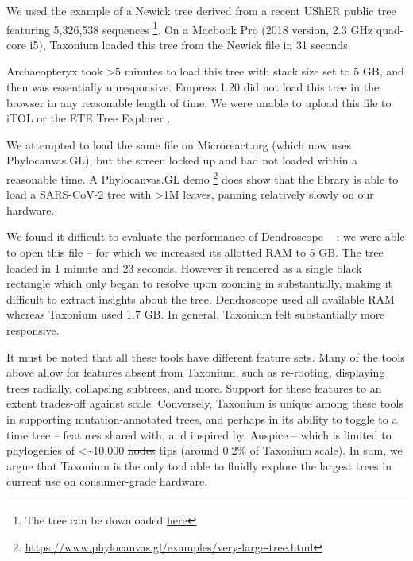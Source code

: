 \documentclass[twocolumn]{bioRxiv}
\providecommand{\DIFadd}[1]{{\protect\color{teal}#1}}
\providecommand{\DIFdel}[1]{{\protect\color{red}\sout{#1}}}
\providecommand{\DIFaddbegin}{}
\providecommand{\DIFaddend}{}
\providecommand{\DIFdelbegin}{}
\providecommand{\DIFdelend}{}
\begin{document}
We used the example of a Newick tree derived from a recent UShER public tree \citep{McBroome2021} featuring 5,326,538 sequences \footnote{The tree can be downloaded \href{https://hgwdev.gi.ucsc.edu/~angie/UShER\_SARS-CoV-2/2022/05/17/public-2022-05-17.all.nwk.gz}{here}}. On a Macbook Pro (2018 version, 2.3 GHz quad-core i5), Taxonium loaded this tree from the Newick file in 31 seconds. 

Archaeopteryx \citep{archaeopteryx} took >5 minutes to load this tree with stack size set to 5 GB, and then was essentially unresponsive. Empress 1.20 \citep{CantrellFedarko2021empress} did not load this tree in the browser in any reasonable length of time. We were unable to upload this file to iTOL \citep{itol} or the ETE Tree Explorer \citep{ete}.

We attempted to load the same file on Microreact.org \citep{argimon2016microreact} (which now uses Phylocanvas.GL), but the screen locked up and had not loaded within a reasonable time. A Phylocanvas.GL demo \footnote{\url{https://www.phylocanvas.gl/examples/very-large-tree.html}} does show that the library \citep{abudahab2021phylocanvas} is able to load a SARS-CoV-2 tree with >1M leaves, panning relatively slowly on our hardware.

We found it difficult to evaluate the performance of Dendroscope \DIFaddbegin \DIFadd{\mbox{%
\citep{pmid18034891}}\hspace{0pt}%
}\DIFaddend : we were able to open this file -- for which we increased its allotted RAM to 5 GB. The tree loaded in 1 minute and 23 seconds. However it rendered as a single black rectangle which only began to resolve upon zooming in substantially, making it difficult to extract insights about the tree. Dendroscope used all available RAM whereas Taxonium used 1.7 GB. In general, Taxonium felt substantially more responsive.


It must be noted that all these tools have different feature sets. Many of the tools above allow for features absent from Taxonium, such as re-rooting, displaying trees radially, collapsing subtrees, and more. Support for these features to an extent trades-off against scale. Conversely, Taxonium is unique among these tools in supporting mutation-annotated trees, and perhaps in its ability to toggle to a time tree -- features shared with, and inspired by, Auspice \citep{nextstrain} -- which is limited to phylogenies of <\textasciitilde10,000 \DIFdelbegin \DIFdel{nodes }\DIFdelend \DIFaddbegin \DIFadd{tips }\DIFaddend (around 0.2\% of  Taxonium scale). In sum, we argue that Taxonium is the only tool able to fluidly explore the largest trees in current use on consumer-grade hardware.
\end{document}
